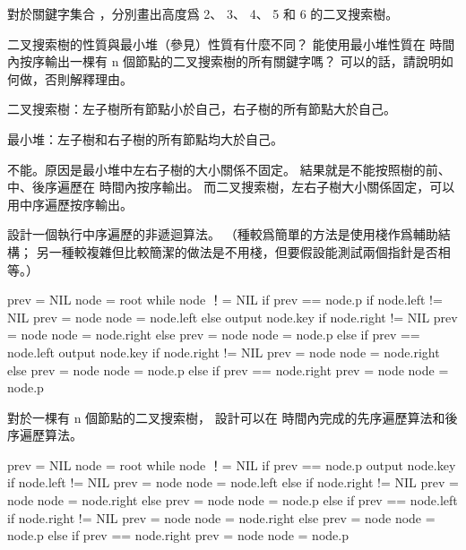 \startsection[
  title={What is a binary search tree?},
]

\startEXERCISE
對於關鍵字集合 ，分別畫出高度爲 2、 3、 4、 5 和 6 的二叉搜索樹。
\stopEXERCISE

\startANSWER
\externalfigure[output/e12_1_1-1]
\externalfigure[output/e12_1_1-2]
\externalfigure[output/e12_1_1-3]
\externalfigure[output/e12_1_1-4]
\externalfigure[output/e12_1_1-5]
\stopANSWER

\startEXERCISE
二叉搜索樹的性質與最小堆（參見\insection[heaps]）性質有什麼不同？
能使用最小堆性質在  時間內按序輸出一棵有 n 個節點的二叉搜索樹的所有關鍵字嗎？
可以的話，請說明如何做，否則解釋理由。
\stopEXERCISE

\startANSWER
二叉搜索樹：左子樹所有節點小於自己，右子樹的所有節點大於自己。

最小堆：左子樹和右子樹的所有節點均大於自己。

不能。原因是最小堆中左右子樹的大小關係不固定。
結果就是不能按照樹的前、中、後序遍歷在  時間內按序輸出。
而二叉搜索樹，左右子樹大小關係固定，可以用中序遍歷按序輸出。
\stopANSWER

\startEXERCISE
設計一個執行中序遍歷的非遞迴算法。
（\hint 種較爲簡單的方法是使用棧作爲輔助結構；
另一種較複雜但比較簡潔的做法是不用棧，但要假設能測試兩個指針是否相等。）
\stopEXERCISE

\startANSWER
{}
\startCLRS
prev = NIL
node = root
while node ！= NIL
	if prev == node.p
		if node.left != NIL
			prev = node
			node = node.left
		else
			output node.key
			if node.right != NIL
				prev = node
				node = node.right
			else
				prev = node
				node = node.p
	else if prev == node.left
		output node.key
		if node.right != NIL
			prev = node
			node = node.right
		else
			prev = node
			node = node.p
	else if prev == node.right
		prev = node
		node = node.p
\stopCLRS
\stopANSWER

\startEXERCISE
對於一棵有 n 個節點的二叉搜索樹，
設計可以在  時間內完成的先序遍歷算法和後序遍歷算法。
\stopEXERCISE

\startANSWER
{}
\startCLRS
prev = NIL
node = root
while node ！= NIL
	if prev == node.p
		output node.key
		if node.left != NIL
			prev = node
			node = node.left
		else
			if node.right != NIL
				prev = node
				node = node.right
			else
				prev = node
				node = node.p
	else if prev == node.left
		if node.right != NIL
			prev = node
			node = node.right
		else
			prev = node
			node = node.p
	else if prev == node.right
		prev = node
		node = node.p
\stopCLRS

